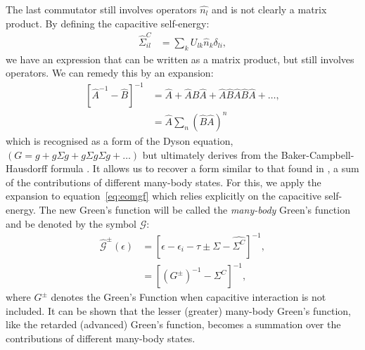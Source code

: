 \documentclass{article}
\begin{document}
\begin{multicols}{2}
        The last commutator still involves operators $\hat{n_l}$ and is not clearly a matrix product. By defining the capacitive self-energy: 
        \begin{align}
        \hat{\Sigma}^C_{il} &= \sum_k U_{lk} \hat{n}_k \delta_{li},
        \end{align}
        we have an expression that can be written as a matrix product, but still involves operators. We can remedy this by an expansion:
        \begin{align}
        \left[ \hat{A}^{-1} - \hat{B}\right]^{-1} &=\hat{A} + \hat{A}\hat{B}\hat{A} + \hat{A}\hat{B}\hat{A}\hat{B}\hat{A} + \ldots,
         \nonumber\\
        &= \hat{A} \sum_n \left(\hat{B}\hat{A}\right)^n\label{eq:expansion}
        \end{align} 
        which is recognised as a form of the Dyson equation, $\left(G = g + g\Sigma g + g\Sigma g \Sigma g + \ldots\right)$ but ultimately derives from the Baker-Campbell-Hausdorff formula  \cite{Mattuck1976}. It allows us to recover a form similar to that found in \citet{haugjauho}, a sum of the contributions of different many-body states. For this, we apply the expansion to equation~\ref{eq:eomgf} which relies explicitly on the capacitive self-energy. The new Green's function will be called the \emph{many-body} Green's function and be denoted by the symbol $\mathscr{G}$:
        \begin{align}
            \mathscr{\hat{G}}^\pm(\epsilon) &= \left[ \epsilon - \epsilon_i - \tau \pm \Sigma - \hat{\Sigma^C}\right]^{-1}, \\
            &= \left[ \left(G^\pm\right)^{-1}- \hat{\Sigma^C}\right]^{-1} ,\nonumber
        \end{align}
        where $G^\pm$ denotes the Green's Function when capacitive interaction is not included. It can be shown that the lesser (greater) many-body Green's function, like the retarded (advanced) Green's function, becomes a summation over the contributions of different many-body states.
        

\end{multicols}
\end{document}

